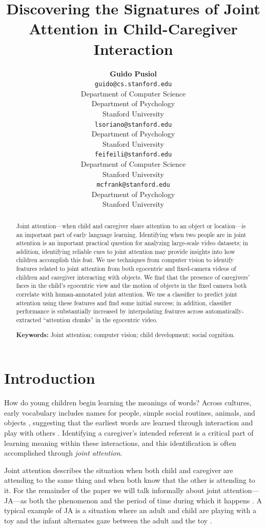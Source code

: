 \documentclass[10pt,letterpaper]{article}
\title{Discovering the Signatures of Joint Attention in Child-Caregiver Interaction}
\author{{\bf Guido Pusiol}\\ 
\texttt{guido@cs.stanford.edu} \\
Department of Computer Science\\
Department of Psychology \\
Stanford University
  \And {\bf Laura Soriano} \\ 
\texttt{lsoriano@stanford.edu} \\
Department of Psychology\\
Stanford University 
\And {\bf Li Fei-Fei} \\
\texttt{feifeili@stanford.edu} \\
  Department of Computer Science\\
Stanford University 
\And {\bf Michael C. Frank} \\ 
\texttt{mcfrank@stanford.edu} \\
  Department of Psychology\\
Stanford University}
\begin{document}
\maketitle

\begin{abstract}
Joint attention---when child and caregiver share attention to an object or location---is an important part of early language learning. Identifying when two people are in joint attention is an important practical question for analyzing large-scale video datasets; in addition, identifying reliable cues to joint attention may provide insights into how children accomplish this feat. We use techniques from computer vision to identify features related to joint attention from both egocentric and fixed-camera videos of children and caregiver interacting with objects. We find that the presence of caregivers' faces in the child's egocentric view and the motion of objects in the fixed camera both correlate with human-annotated joint attention. We use a classifier to predict joint attention using these features and find some initial success; in addition, classifier performance is substantially increased by interpolating features across automatically-extracted ``attention chunks'' in the egocentric video. 

\textbf{Keywords:} 
Joint attention; computer vision; child development; social cognition. 
\end{abstract}

\section{Introduction}

How do young children begin learning the meanings of words? Across cultures, early vocabulary includes names for people, simple social routines, animals, and objects \cite{tardif2008}, suggesting that the earliest words are learned through interaction and play with others \cite{bruner1985}.  Identifying a caregiver's intended referent is a critical part of learning meaning within these interactions, and this identification is often accomplished through \emph{joint attention}.

Joint attention describes the situation when both child and caregiver are attending to the same thing and when both know that the other is attending to it. For the remainder of the paper we will talk informally about joint attention---JA---as both the phenomenon and the period of time during which it happens \cite{carpenter2011}.  A typical example of JA is a situation where an adult and child are playing with a toy and the infant alternates gaze between the adult and the toy \cite{carpenter1998}. 
\end{document}
